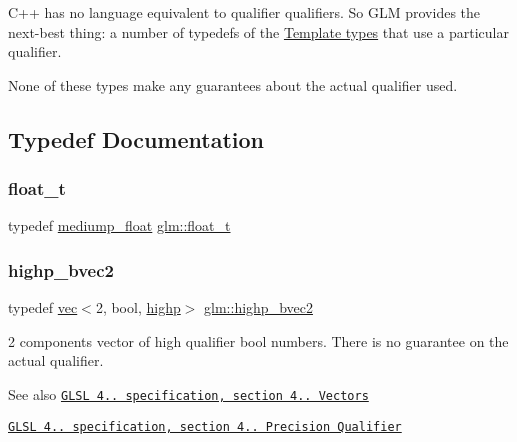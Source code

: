 C++ has no language equivalent to qualifier qualifiers. So G\+LM provides the next-\/best thing\+: a number of typedefs of the \hyperlink{group__core__template}{Template types} that use a particular qualifier.

None of these types make any guarantees about the actual qualifier used. 

\subsection{Typedef Documentation}
\mbox{\label{group__core__precision_gae01b87f81bd15327230bf1b47c482b24}} 
\subsubsection{\texorpdfstring{float\+\_\+t}{float\_t}}
{\footnotesize\ttfamily typedef \hyperlink{group__core__precision_gac785826c039fe6c97c03b37c81c1a68e}{mediump\+\_\+float} \hyperlink{group__core__precision_gae01b87f81bd15327230bf1b47c482b24}{glm\+::float\+\_\+t}}

\mbox{\label{group__core__precision_gad8f63e4c7546320f6b72808fadfda3c2}} 
\subsubsection{\texorpdfstring{highp\+\_\+bvec2}{highp\_bvec2}}
{\footnotesize\ttfamily typedef \hyperlink{structglm_1_1vec}{vec}$<$2, bool, \hyperlink{namespaceglm_a36ed105b07c7746804d7fdc7cc90ff25ac6f7eab42eacbb10d59a58e95e362074}{highp}$>$ \hyperlink{group__core__precision_gad8f63e4c7546320f6b72808fadfda3c2}{glm\+::highp\+\_\+bvec2}}

2 components vector of high qualifier bool numbers. There is no guarantee on the actual qualifier.

\begin{DoxySeeAlso}{See also}
\href{http://www.opengl.org/registry/doc/GLSLangSpec.4.20.8.pdf}{\tt G\+L\+SL 4.. specification, section 4.. Vectors} 

\href{http://www.opengl.org/registry/doc/GLSLangSpec.4.20.8.pdf}{\tt G\+L\+SL 4.. specification, section 4.. Precision Qualifier} 
\end{DoxySeeAlso}
\mbox{\label{group__core__precision_ga0e3365e13160aa93d2a9c68529a013ce}} 

